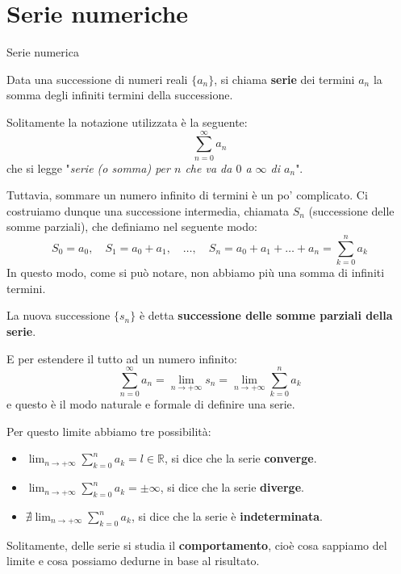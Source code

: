 \documentclass[12pt]{report}
\newcommand{\R}{\mathbb{R}}
\begin{document}
	\chapter{Serie numeriche}
	
	\begin{definizione}{Serie numerica}{}
		
		Data una successione di numeri reali $\{a_n\}$, si chiama \textbf{serie} dei termini $a_n$ la somma degli infiniti termini della successione.
		
	\end{definizione}
	
	Solitamente la notazione utilizzata è la seguente:
	\[
	\sum_{n=0}^{\infty} a_n
	\]
	che si legge "\textit{serie (o somma) per $n$ che va da $0$ a $\infty$ di $a_n$}".
	
	Tuttavia, sommare un numero infinito di termini è un po' complicato. Ci costruiamo dunque una successione intermedia, chiamata $S_n$ (successione delle somme parziali), che definiamo nel seguente modo:
	\[
	S_0 = a_0, \quad S_1 = a_0 + a_1, \quad \dots, \quad S_n = a_0 + a_1 + \dots + a_n = \sum_{k=0}^{n} a_k
	\]
	In questo modo, come si può notare, non abbiamo più una somma di infiniti termini.
	
	La nuova successione $\{s_n\}$ è detta \textbf{successione delle somme parziali della serie}.
	
	E per estendere il tutto ad un numero infinito:
	\[
	\sum_{n=0}^{\infty} a_n = \lim_{n \to +\infty} s_n = \lim_{n \to +\infty} \sum_{k=0}^{n} a_k
	\]
	e questo è il modo naturale e formale di definire una serie.
	
	Per questo limite abbiamo tre possibilità:
	\begin{itemize}
		
		\item $\lim_{n \to +\infty} \sum_{k=0}^{n} a_k = l \in \R$, si dice che la serie \textbf{converge}.
		
		\item $\lim_{n \to +\infty} \sum_{k=0}^{n} a_k = \pm\infty$, si dice che la serie \textbf{diverge}.
		
		\item $\nexists \lim_{n \to +\infty} \sum_{k=0}^{n} a_k$, si dice che la serie è \textbf{indeterminata}.
		
	\end{itemize}
	
	Solitamente, delle serie si studia il \textbf{comportamento}, cioè cosa sappiamo del limite e cosa possiamo dedurne in base al risultato.
	
\end{document}
